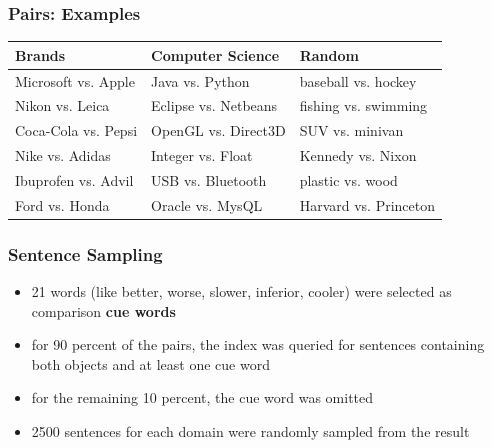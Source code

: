 \documentclass[11pt,aspectratio=169,usenames,dvipsnames]{beamer}
\begin{document}
    \begin{frame}[t]
        \frametitle{Pairs: Examples}

        \begin{tabularx}{\textwidth}{XXX}
            \toprule
            Brands & Computer Science & Random \\
            \midrule
            Microsoft vs. Apple & Java vs. Python & baseball vs. hockey \\
            Nikon vs. Leica & Eclipse vs. Netbeans & fishing vs. swimming\\
            Coca-Cola vs. Pepsi & OpenGL vs. Direct3D & SUV vs. minivan\\
            Nike vs. Adidas & Integer vs. Float & Kennedy vs. Nixon\\
            Ibuprofen vs. Advil & USB vs. Bluetooth & plastic vs. wood\\
            Ford vs. Honda & Oracle vs. MysQL & Harvard vs. Princeton\\

            \bottomrule

        \end{tabularx}

    \end{frame}

    \begin{frame}[t]
        \frametitle{Sentence Sampling}

        \begin{itemize}
            \item 21 words (like better, worse, slower, inferior, cooler) were selected as comparison \textbf{cue words}\pause
            \item for 90 percent of the pairs, the index was queried for sentences containing both objects and at least one cue word
            \item for the remaining 10 percent, the cue word was omitted\pause
            \item 2500 sentences for each domain were randomly sampled from the result
        \end{itemize}

    \end{frame}
\end{document}
